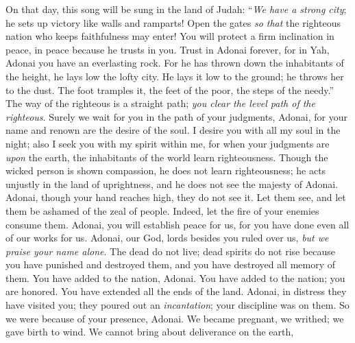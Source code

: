 \begin{biblechapter} %
 On that day, this song will be sung in the land of Judah: “\textit{We have a strong city}; 
he sets up victory like walls and ramparts!
\verse Open the gates \textit{so that} the righteous nation who keeps faithfulness may enter!
\verse You will protect a firm inclination in peace, 
in peace because he trusts in you.
\verse Trust in Adonai forever, 
for in Yah, Adonai you have an everlasting rock.
\verse For he has thrown down the inhabitants of the height, 
he lays low the lofty city. 
He lays it low to the ground; 
he throws her to the dust.
\verse The foot tramples it, 
the feet of the poor, the steps of the needy.”
 The way of the righteous is a straight path; 
\textit{you clear the level path of the righteous}.
\verse Surely we wait for you in the path of your judgments, Adonai, 
for your name and renown are the desire of the soul.
\verse I desire you with all my soul in the night; 
also I seek you with my spirit within me, 
for when your judgments are \textit{upon} the earth, 
the inhabitants of the world learn righteousness.
\verse Though the wicked person is shown compassion, he does not learn righteousness; he acts unjustly in the land of uprightness, 
and he does not see the majesty of Adonai.
\verse Adonai, though your hand reaches high, they do not see it.
\verse Let them see, and let them be ashamed of the zeal of people. 
Indeed, let the fire of your enemies consume them.
\verse Adonai, you will establish peace for us, 
for you have done even all of our works for us.
\verse Adonai, our God, lords besides you ruled over us, 
\textit{but we praise your name alone}.
\verse The dead do not live; 
dead spirits do not rise 
because you have punished and destroyed them, 
and you have destroyed all memory of them.
\verse You have added to the nation, Adonai. 
You have added to the nation; you are honored. 
You have extended all the ends of the land.
\verse Adonai, in distress they have visited you; 
they poured out an \textit{incantation}; 
your discipline was on them. So we were because of your presence, Adonai.
\verse We became pregnant, we writhed; 
we gave birth to wind. 
We cannot bring about deliverance on the earth, 

\end{biblechapter}
